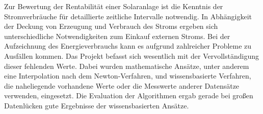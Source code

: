 

\noindent Zur Bewertung der Rentabilität einer Solaranlage ist die Kenntnis der Stromverbräuche für detaillierte zeitliche Intervalle notwendig. In Abhängigkeit der Deckung von Erzeugung und Verbrauch des Stroms ergeben sich unterschiedliche Notwendigkeiten zum Einkauf externen Stroms. Bei der Aufzeichnung des Energieverbrauchs kann es aufgrund zahlreicher Probleme zu Ausfällen kommen.
Das Projekt befasst sich wesentlich mit der Vervollständigung dieser fehlenden Werte. Dabei wurden mathematische Ansätze, unter anderem eine Interpolation nach dem Newton-Verfahren, und wissensbasierte Verfahren, die naheliegende vorhandene Werte oder die Messwerte anderer Datensätze verwenden, eingesetzt. Die Evaluation der Algorithmen ergab gerade bei großen Datenlücken gute Ergebnisse der wissensbasierten Ansätze.
